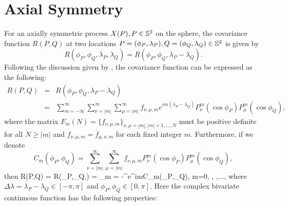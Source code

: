 \vskip 8pt		
		\section{Axial Symmetry}

For an axially symmetric process $X(P), P \in \mathbb{S}^2$ on the sphere, the covariance function $R(P,Q)$ at two locations $P=(\phi_P, \lambda_P), Q=(\phi_Q,\lambda_Q) \in \mathbb{S}^2$ is given by 					 
\[
R(\phi_P, \phi_Q, \lambda_P, \lambda_Q) = R(\phi_P, \phi_Q, \lambda_P-\lambda_Q).
\]
Following the discussion given by \cite{Stein2007, Huang2012}, the covariance function can be expressed as the following:					
		\begin{eqnarray} \label{axially-symmetry-cov}
			R(P,Q)  & = & R(\phi_P, \phi_Q, \lambda_P-\lambda_Q) \nonumber \\
			& = & \sum_{m=-\infty}^{\infty} \sum_{\nu=|m|}^\infty \sum_{\mu=|m|}^\infty f_{\nu,\mu,m} e^{im (\lambda_P-\lambda_Q)} P_{\nu}^m(\cos \phi_P) P_{\mu}^m (\cos \phi_Q),
		\end{eqnarray}
where the matrix $F_m(N) = \{ f_{\nu,\mu,m} \}_{\nu,\mu=|m|,|m|+1, \ldots, N }$ must be positive definite for all $N \ge |m|$ and $f_{\nu,\mu, m} = \overline{f}_{\mu, \nu, m}$ for each fixed integer $m$. Furthermore, if we denote
\[
C_m(\phi_P, \phi_Q) = \sum_{\nu=|m|}^\infty \sum_{\mu=|m|}^\infty f_{\nu,\mu,m} P_{\nu}^m(\cos \phi_P) P_{\mu}^m (\cos \phi_Q),
\]
then 				
		\beq \label{R(PQ)-01}
		R(P,Q) = R(\phi_P,\phi_Q,\Delta\lambda) = \sum_{m = -\infty}^{\infty}e^{im\Delta\lambda}C_m(\phi_P,\phi_Q), \quad m=0, , ,...,
		\eeq
where $\Delta\lambda = \lambda_P - \lambda_Q \in [-\pi, \pi]$ and $\phi_P, \phi_Q \in [0,\pi]$. Here the complex bivariate continuous function \Cm has the following properties:

